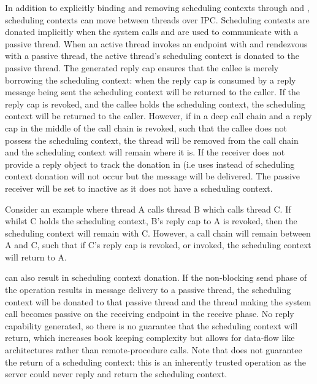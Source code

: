 In addition to explicitly binding and removing scheduling contexts through
 and
, scheduling contexts can move
between threads over IPC.  Scheduling contexts are donated implicitly when the system calls
 and  are used to
communicate with a passive thread.  When an active thread invokes an endpoint with
 and rendezvous with a passive thread, the active thread's scheduling
context is donated to the passive thread. The generated reply cap ensures that the callee is merely
borrowing the scheduling context: when the reply cap is consumed by a reply message being sent the
scheduling context will be returned to the caller.  If the reply cap is revoked, and the callee
holds the scheduling context, the scheduling context will be returned to the caller.  However, if in
a deep call chain and a reply cap in the middle of the call chain is revoked, such that the callee
does not possess the scheduling context, the thread will be removed from the call chain and the
scheduling context will remain where it is.  If the receiver does not provide a reply object to
track the donation in (i.e uses  instead of
 scheduling context donation will not occur but the message will be
delivered. The passive receiver will be set to inactive as it does not have a scheduling context.

Consider an example where thread A calls thread B which calls thread C.  If whilst C holds the
scheduling context, B's reply cap to A is revoked, then the scheduling context will remain with C.
However, a call chain will remain between A and C, such that if C's reply cap is revoked, or
invoked, the scheduling context will return to A.

 can also result in scheduling context donation.
If the non-blocking send phase of the operation results in message delivery to a passive thread, the
scheduling context will be donated to that passive thread and the thread making the system call becomes passive on the
receiving endpoint in the receive phase.  No reply capability generated, so there
is no guarantee that the scheduling context will return, which increases book keeping complexity but allows
for data-flow like architectures rather than remote-procedure calls. Note that 
does not guarantee the return of a scheduling context: this is an inherently trusted operation as the
server could never reply and return the scheduling context.

